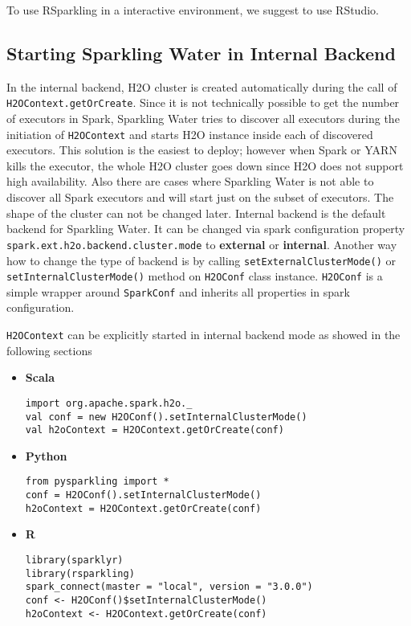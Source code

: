 To use RSparkling in a interactive environment, we suggest to use RStudio.

\subsection{Starting Sparkling Water in Internal Backend}

In the internal backend, H2O cluster is created automatically during the call of \texttt{H2OContext.getOrCreate}. Since
it is not technically possible to get the number of executors in Spark, Sparkling Water tries to discover all executors
during the initiation of \texttt{H2OContext} and starts H2O instance inside each of discovered executors. This solution
is the easiest to deploy; however when Spark or YARN kills the executor, the whole H2O cluster goes down since H2O
does not support high availability. Also there are cases where Sparkling Water is not able to discover all Spark
executors and will start just on the subset of executors. The shape of the cluster can not be changed later.
Internal backend is the default backend for Sparkling Water. It can be changed via spark configuration property
\texttt{spark.ext.h2o.backend.cluster.mode} to \textbf{external} or \textbf{internal}. Another way how to change the
type of backend is by calling \texttt{setExternalClusterMode()} or \texttt{setInternalClusterMode()} method
on \texttt{H2OConf} class instance. \texttt{H2OConf} is a simple wrapper around \texttt{SparkConf} and inherits all
properties in spark configuration.

\texttt{H2OContext} can be explicitly started in internal backend mode as showed in the following sections

\begin{itemize}
    \item \textbf{Scala} \begin{lstlisting}[style=Scala]
import org.apache.spark.h2o._
val conf = new H2OConf().setInternalClusterMode()
val h2oContext = H2OContext.getOrCreate(conf)
    \end{lstlisting}
    \item \textbf{Python} \begin{lstlisting}[style=Python]
from pysparkling import *
conf = H2OConf().setInternalClusterMode()
h2oContext = H2OContext.getOrCreate(conf)
    \end{lstlisting}
    \item \textbf{R} \begin{lstlisting}[style=R]
library(sparklyr)
library(rsparkling)
spark_connect(master = "local", version = "3.0.0")
conf <- H2OConf()$setInternalClusterMode()
h2oContext <- H2OContext.getOrCreate(conf)
    \end{lstlisting}
\end{itemize}

